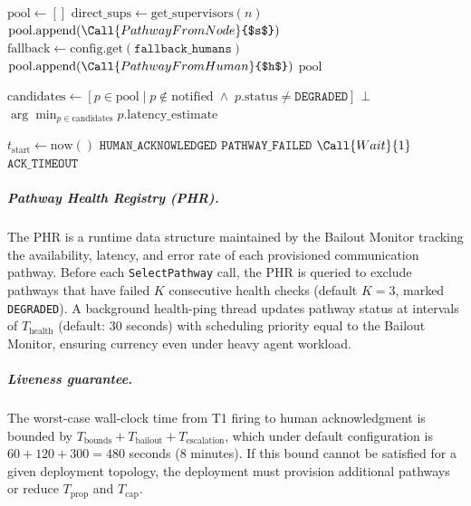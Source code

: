 \begin{algorithm}[H]
\begin{algorithmic}[1]
    \State $\text{pool} \leftarrow []$
    \State $\text{direct\_sups} \leftarrow \text{get\_supervisors}(n)$
        \State $\text{pool}.\text{append}(\Call{PathwayFromNode}{$s$})$
    \EndFor
    \State $\text{fallback} \leftarrow \text{config.get}(\texttt{fallback\_humans})$
        \State $\text{pool}.\text{append}(\Call{PathwayFromHuman}{$h$})$
    \EndFor
    \State \Return $\text{pool}$
\EndFunction

\State

    \State $\text{candidates} \leftarrow [p \in \text{pool} \mid p \notin \text{notified} \;\land\; p.\text{status} \neq \texttt{DEGRADED}]$
        \State \Return $\bot$
    \EndIf
    \State \Return $\arg\min_{p \in \text{candidates}} p.\text{latency\_estimate}$
\EndFunction

\State

    \State $t_{\text{start}} \leftarrow \text{now}()$
            \State \Return $\texttt{HUMAN\_ACKNOWLEDGED}$
        \EndIf
            \State \Return $\texttt{PATHWAY\_FAILED}$
        \EndIf
        \State $\Call{Wait}{1}$
    \EndWhile
    \State \Return $\texttt{ACK\_TIMEOUT}$
\EndFunction
\end{algorithmic}
\end{algorithm}

\subparagraph{Pathway Health Registry (PHR).} The PHR is a runtime data structure maintained by the Bailout Monitor tracking the availability, latency, and error rate of each provisioned communication pathway. Before each \texttt{SelectPathway} call, the PHR is queried to exclude pathways that have failed $K$ consecutive health checks (default $K = 3$, marked \texttt{DEGRADED}). A background health-ping thread updates pathway status at intervals of $T_{\text{health}}$ (default: 30 seconds) with scheduling priority equal to the Bailout Monitor, ensuring currency even under heavy agent workload.

\subparagraph{Liveness guarantee.} The worst-case wall-clock time from T1 firing to human acknowledgment is bounded by $T_{\text{bounds}} + T_{\text{bailout}} + T_{\text{escalation}}$, which under default configuration is $60 + 120 + 300 = 480$ seconds (8 minutes). If this bound cannot be satisfied for a given deployment topology, the deployment must provision additional pathways or reduce $T_{\text{prop}}$ and $T_{\text{cap}}$.

